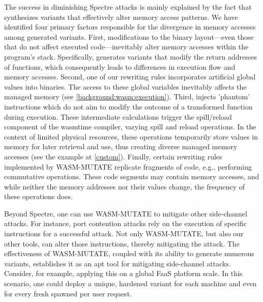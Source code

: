 \begin{strategy}
    The success in diminishing Spectre attacks is mainly explained by the fact that \tool synthesizes variants that effectively alter memory access patterns. 
    We have identified four primary factors responsible for the divergence in memory accesses among \tool generated variants.
    First, modifications to the binary layout—even those that do not affect executed code—inevitably alter memory accesses within the program's stack. 
    Specifically, \tool generates variants that modify the return addresses of functions, which consequently leads to differences in execution flow and memory accesses.
    Second, one of our rewriting rules incorporates artificial global values into \Wasm binaries. 
    The access to these global variables inevitably affects the managed memory (see \autoref{background:wasm:execution}).
    Third, \tool injects 'phantom' instructions which do not aim to modify the outcome of a transformed function during execution. 
    These intermediate calculations trigger the spill/reload component of the wasmtime compiler, varying spill and reload operations. 
    In the context of limited physical resources, these operations temporarily store values in memory for later retrieval and use, thus creating diverse managed memory accesses (see the example at \autoref{custom}).
    Finally, certain rewriting rules implemented by WASM-MUTATE replicate fragments of code, e.g., performing commutative operations. 
    These code segments may contain memory accesses, and while neither the memory addresses nor their values change, the frequency of these operations does.
\end{strategy}



\begin{tcolorbox}[title=Reflection,boxrule=1pt,arc=.2em,boxsep=1.0mm]

    Beyond Spectre, one can use WASM-MUTATE to mitigate other side-channel attacks. 
    For instance, port contention attacks \cite{10.1145/3488932.3517411} rely on the execution of specific instructions for a successful attack. 
    Not only WASM-MUTATE, but also our other tools, can alter those instructions, thereby mitigating the attack. 
    The effectiveness of WASM-MUTATE, coupled with its ability to generate numerous variants, establishes it as an apt tool for mitigating side-channel attacks.
    Consider, for example, applying this on a global FaaS platform scale. 
    In this scenario, one could deploy a unique, hardened variant for each machine and even for every fresh \Wasm spawned per user request.

\end{tcolorbox}


